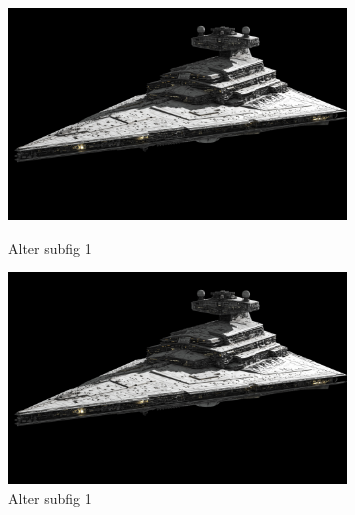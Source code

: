 \documentclass{article}
\begin{document}
\begin{figure}[H]
    \centering
    \begin{minipage}[b]{0.45\textwidth}
        \centering
        \includegraphics[width=0.8\textwidth]{figures/1.jpg}
        \caption{Alter subfig 1}
        \label{AltSubfig1}
    \end{minipage}
    \begin{minipage}[b]{0.45\textwidth}
        \centering
        \includegraphics[width=0.8\textwidth]{figures/1.jpg}
        \caption{Alter subfig 1}
        \label{AltSubfig2}
    \end{minipage}
\end{figure}


\ifx\allfiles\undefined         %
\end{document}
